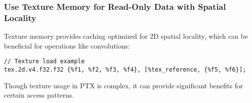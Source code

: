 \subsubsection{Use Texture Memory for Read-Only Data with Spatial Locality}

Texture memory provides caching optimized for 2D spatial locality, which can be beneficial for operations like convolutions:

\begin{lstlisting}[style=ptx]
// Texture load example
tex.2d.v4.f32.f32 {%f1, %f2, %f3, %f4}, [%tex_reference, {%f5, %f6}];
\end{lstlisting}

Though texture usage in PTX is complex, it can provide significant benefits for certain access patterns.

